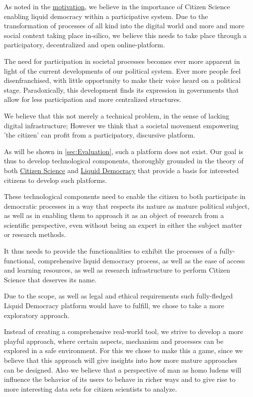 As noted in the \href{ssec:Motivation}{motivation}, we believe in the importance of Citizen Science enabling liquid democracy within a participative system. Due to the transformation of processes of all kind into the digital world and more and more social context taking place in-silico, we believe this needs to take place through a participatory, decentralized and open online-platform.

The need for participation in societal processes becomes ever more apparent in light of the current developments of our political system. Ever more people feel disenfranchised, with little opportunity to make their voice heard on a political stage. Paradoxically, this development finds its expression in governments that allow for less participation and more centralized structures.

We believe that this not merely a technical problem, in the sense of lacking digital infrastructure; However we think that a societal movement empowering 'the citizen' can profit from a participatory, discursive platform.

As will be shown in \ref{sec:Evaluation}, such a platform does not exist. Our goal is thus to develop technological components, thoroughly grounded in the theory of both \href{sec:Theory_CS}{Citizen Science} and \href{sec:Theory_LD}{Liquid Democracy} that provide a basis for interested citizens to develop such platforms.

These technological components need to enable the citizen to both participate in democratic processes in a way that respects its nature as mature political subject, as well as in enabling them to approach it as an object of research from a scientific perspective, even without being an expert in either the subject matter or research methods. 

It thus needs to provide the functionalities to exhibit the processes of a fully-functional, comprehensive liquid democracy process, as well as the ease of access and learning resources, as well as research infrastructure to perform Citizen Science that deserves its name.

Due to the scope, as well as legal and ethical requirements such fully-fledged Liquid Democracy platform would have to fulfill, we chose to take a more exploratory approach. 

Instead of creating a comprehensive real-world tool, we strive to develop a more playful approach, where certain aspects, mechanism and processes can be explored in a safe environment. For this we chose to make this a game, since we believe that this approach will give insights into how more mature approaches can be designed. Also we believe that a perspective of man as homo ludens will influence the behavior of its users to behave in richer ways and to give rise to more interesting data sets for citizen scientists to analyze.

